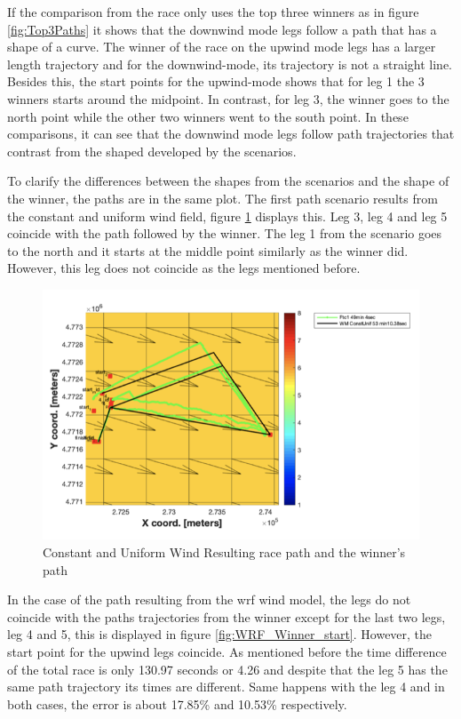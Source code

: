 If the comparison from the race only uses the top three winners as in figure \ref{fig:Top3Paths} it shows that the downwind mode legs follow a path that has a shape of a curve. The winner of the race on the upwind mode legs has a larger length trajectory and for the downwind-mode, its trajectory is not a straight line. Besides this, the start points for the upwind-mode shows that for leg 1 the 3 winners starts around the midpoint. In contrast, for leg 3, the winner goes to the north point while the other two winners went to the south point. In these comparisons, it can see that the downwind mode legs follow path trajectories that contrast from the shaped developed by  the scenarios.\par 

To clarify the differences between the shapes from the scenarios and the shape of the winner, the paths are in the same plot. The first path scenario results from the constant and uniform wind field, figure \ref{fig:winnerConstUnif} displays this. Leg 3, leg 4 and leg 5 coincide with the path followed by the winner. The leg 1 from the scenario goes to the north and it starts at the middle point similarly as the winner did. However, this leg does not coincide as the legs mentioned before. \par 

\begin{figure}[hbt!]
    \centering
    \includegraphics[width=1\linewidth]{images/WinnerConst1200.png}
    \caption{Constant and Uniform Wind Resulting race path and the winner's path}
    \label{fig:winnerConstUnif}
\end{figure}

In the case of the path resulting from the \acrshort{wrf} wind model, the legs do not coincide with the paths trajectories from the winner except for the last two legs, leg 4 and 5, this is displayed in figure \ref{fig:WRF_Winner_start}. However, the start point for the upwind legs coincide. As mentioned before the time difference of the total race is only 130.97 seconds or 4.26 and despite that the leg 5 has the same path trajectory its times are different. Same happens with the leg 4 and in both cases, the error is about 17.85\% and 10.53\% respectively. \par 


